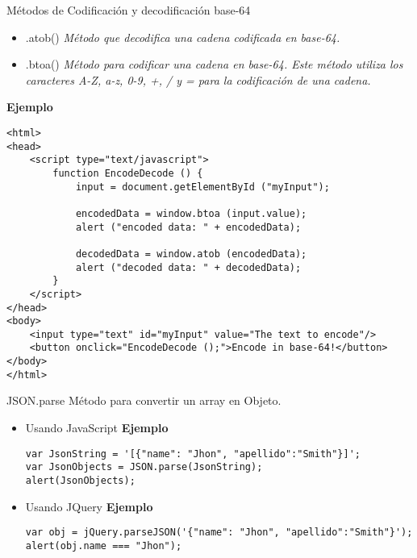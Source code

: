 \begin{frame}[fragile]{Métodos de Codificación y decodificación base-64} %

\begin{itemize}
\item .atob() \textit{Método que decodifica una cadena codificada en base-64.}

\item .btoa() \textit{Método para codificar una cadena en base-64. Este método utiliza los caracteres A-Z,  a-z, 0-9, +, / y = para la codificación de una cadena.}
\end{itemize}

\textbf{Ejemplo}
\begin{lstlisting}
<html>
<head>
    <script type="text/javascript">
        function EncodeDecode () {
            input = document.getElementById ("myInput");

            encodedData = window.btoa (input.value);
            alert ("encoded data: " + encodedData);

            decodedData = window.atob (encodedData);
            alert ("decoded data: " + decodedData);
        }
    </script>
</head>
<body>
    <input type="text" id="myInput" value="The text to encode"/>
    <button onclick="EncodeDecode ();">Encode in base-64!</button>
</body>
</html>
\end{lstlisting}
\end{frame}

\begin{frame}[fragile]{JSON.parse} %
Método para convertir un array en Objeto.
\begin{itemize}
\item Usando JavaScript
\textbf{Ejemplo}
\begin{lstlisting}
var JsonString = '[{"name": "Jhon", "apellido":"Smith"}]';
var JsonObjects = JSON.parse(JsonString);
alert(JsonObjects);
\end{lstlisting}
\item Usando JQuery
\textbf{Ejemplo}
\begin{lstlisting}
var obj = jQuery.parseJSON('{"name": "Jhon", "apellido":"Smith"}');
alert(obj.name === "Jhon");
\end{lstlisting}
\end{itemize}
\end{frame}


